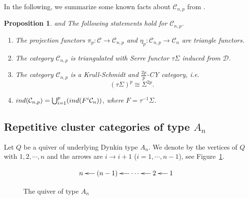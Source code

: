 \documentclass[a4paper,reqno,11pt]{amsart}
\newtheorem{proposition}[theorem]{Proposition}
\theoremstyle{definition}
\def\C{\mathcal{C}}
\def\D{\mathcal{D}}
\providecommand{\ind}{\mathop{\rm ind}\nolimits}%
\begin{document}
In the following, we summarize some known facts about $\C_{n,p}$ from \cite{L}.
\begin{proposition} \cite[Proposition 3.3]{Z} and \cite[Lemma 2.7]{L} The following statements hold for $\C_{n,p}$.
\begin{enumerate}
\item The projection functors $\pi_p\colon\C\rightarrow\C_{n,p}$ and $\eta_p\colon\C_{n,p}\rightarrow\C_{n}$ are triangle functors.
\item The category $\C_{n,p}$ is triangulated with Serre functor $\tau\Sigma$ induced from $\D$.
\item The category $\C_{n,p}$ is a Krull-Schmidt and $\frac{2p}{p}$-CY category, i.e.
$$(\tau\Sigma)^p\cong \Sigma^{2p}.$$
\item  $\ind(\C_{n,p})=\bigcup_{i=1}^{p}(\ind(F^i\C_n))$, where $F=\tau^{-1}\Sigma$.
\end{enumerate}
\end{proposition}

\subsection{Repetitive cluster categories of type $A_{n}$}
Let $Q$ be a quiver of underlying Dynkin type $A_n$. We denote by the vertices of $Q$ with $1,2,\cdots, n$ and the arrows are $i\rightarrow i+1$ ($i=1, \cdots , n-1$), see Figure~\ref{quiverAn}.
\vspace{-2mm}

\begin{figure}[H]
\begin{center}
\[\xymatrix@R0pt@C14pt{
 n
& (n-1)\ar[l]
&\cdots \ar[l]
&2\ar[l]
&1\ar[l].
}
\]
\caption{The quiver of type  $A_n$}
\label{quiverAn}
\end{center}
\end{figure}
\vspace{-2mm}
\end{document}
